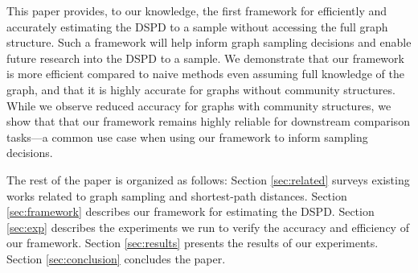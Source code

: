 This paper provides, to our knowledge, the first framework for efficiently and accurately estimating the DSPD to a sample without accessing the full graph structure. Such a framework will help inform graph sampling decisions and enable future research into the DSPD to a sample. We demonstrate that our framework is more efficient compared to naive methods even assuming full knowledge of the graph, and that it is highly accurate for graphs without community structures. While we observe reduced accuracy for graphs with community structures, we show that that our framework remains highly reliable for downstream comparison tasks---a common use case when using our framework to inform sampling decisions.

The rest of the paper is organized as follows: Section \ref{sec:related} surveys existing works related to graph sampling and shortest-path distances. Section \ref{sec:framework} describes our framework for estimating the DSPD. Section \ref{sec:exp} describes the experiments we run to verify the accuracy and efficiency of our framework. Section \ref{sec:results} presents the results of our experiments. Section \ref{sec:conclusion} concludes the paper.
